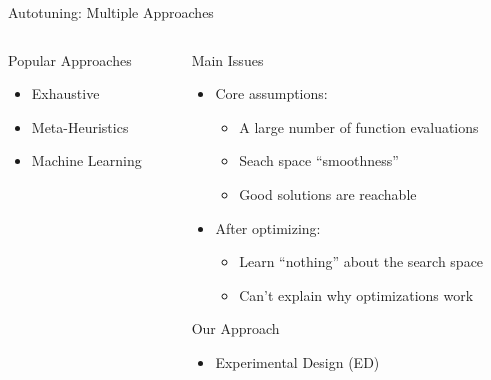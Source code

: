 \documentclass[10pt, compress, aspectratio=169, xcolor={table,usenames,dvipsnames}]{beamer}
\begin{document}
\begin{frame}[label={sec:org5112a02}]{Autotuning: Multiple Approaches}
\begin{columns}
\begin{column}{0.5\columnwidth}
\begin{block}{Popular Approaches}
\footnotesize
\begin{itemize}
\item \colorbox{red!25}{Exhaustive}
\item \colorbox{green!25}{Meta-Heuristics}
\item \colorbox{cyan!25}{Machine Learning}
\end{itemize}
\normalsize

\vspace{-.4cm}


\end{block}
\end{column}

\begin{column}{0.5\columnwidth}
\begin{block}{Main Issues}
\begin{itemize}
\item Core \alert{assumptions}:
\begin{itemize}
\item A large number of function evaluations
\item Seach space ``smoothness''
\item Good solutions are reachable
\end{itemize}
\item After optimizing:
\begin{itemize}
\item \alert{Learn ``nothing''} about the search space
\item \alert{Can't explain} why optimizations work
\end{itemize}
\end{itemize}
\begin{block}{Our Approach}
\begin{itemize}
\item \alert{Experimental Design} (\alert{ED})
\end{itemize}
\end{block}
\end{block}
\end{column}
\end{columns}
\end{frame}
\end{document}

